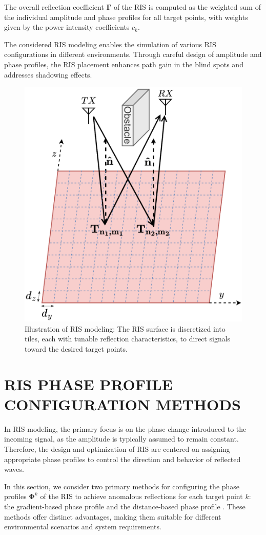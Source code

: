 \documentclass{IEEEoj}
\begin{document}
The overall reflection coefficient $\mathbf{\Gamma}$ of the RIS is computed as the weighted sum of the individual amplitude and phase profiles for all target points, with weights given by the power intensity coefficients $c_k$.

The considered RIS modeling enables the simulation of various RIS configurations in different environments. Through careful design of amplitude and phase profiles, the RIS placement enhances path gain in the blind spots and addresses shadowing effects.

\begin{figure}
	\centering \includegraphics[width=.7\linewidth]{RIS_Modeling.png}
	\caption{Illustration of RIS modeling: The RIS surface is discretized into tiles, each with tunable reflection characteristics, to direct signals toward the desired target points.}
	\label{RIS_Modeling}
\end{figure}

\section{RIS PHASE PROFILE CONFIGURATION METHODS} \label{sec:phase_profile_section}
In RIS modeling, the primary focus is on the phase change introduced to the incoming signal, as the amplitude is typically assumed to remain constant. Therefore, the design and optimization of RIS are centered on assigning appropriate phase profiles to control the direction and behavior of reflected waves.

In this section, we consider two primary methods for configuring the phase profiles $\mathbf{\Phi}^k$ of the RIS to achieve anomalous reflections for each target point $k$: the gradient-based phase profile \cite{phase_grad_paper} and the distance-based phase profile \cite{Tang}. These methods offer distinct advantages, making them suitable for different environmental scenarios and system requirements.
\end{document}
